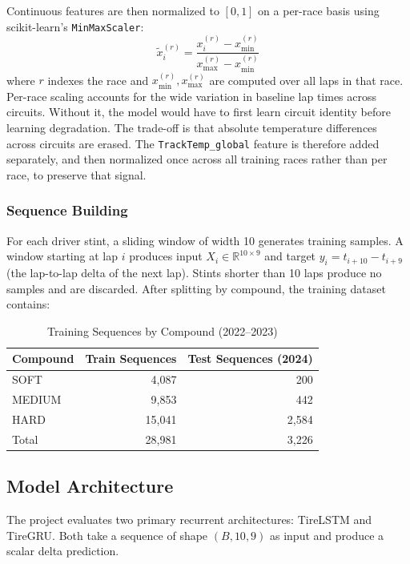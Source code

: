 Continuous features are then normalized to $[0, 1]$ on a per-race basis using scikit-learn's \texttt{MinMaxScaler}:
\begin{equation}
\tilde{x}_i^{(r)} = \frac{x_i^{(r)} - x_{\min}^{(r)}}{x_{\max}^{(r)} - x_{\min}^{(r)}}
\end{equation}
where $r$ indexes the race and $x_{\min}^{(r)}, x_{\max}^{(r)}$ are computed over all laps in that race. Per-race scaling accounts for the wide variation in baseline lap times across circuits. Without it, the model would have to first learn circuit identity before learning degradation. The trade-off is that absolute temperature differences across circuits are erased. The \texttt{TrackTemp\_global} feature is therefore added separately, and then normalized once across all training races rather than per race, to preserve that signal.

\subsubsection{Sequence Building}

For each driver stint, a sliding window of width 10 generates training samples. A window starting at lap $i$ produces input $X_i \in \mathbb{R}^{10 \times 9}$ and target $y_i = t_{i+10} - t_{i+9}$ (the lap-to-lap delta of the next lap). Stints shorter than 10 laps produce no samples and are discarded. After splitting by compound, the training dataset contains:

\begin{table}[h]
\centering
\caption{Training Sequences by Compound (2022--2023)}
\begin{tabular}{lrr}
\toprule
Compound & Train Sequences & Test Sequences (2024) \\
\midrule
SOFT   & 4,087  & 200 \\
MEDIUM & 9,853  & 442 \\
HARD   & 15,041 & 2,584 \\
\midrule
Total  & 28,981 & 3,226 \\
\bottomrule
\end{tabular}
\end{table}

\subsection{Model Architecture}

The project evaluates two primary recurrent architectures: TireLSTM and TireGRU. Both take a sequence of shape $(B, 10, 9)$ as input and produce 
a scalar delta prediction.

